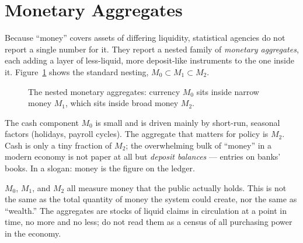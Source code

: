 \section{Monetary Aggregates}

Because ``money'' covers assets of differing liquidity, statistical agencies do not report a single number for it. They report a nested family of \emph{monetary aggregates}, each adding a layer of less-liquid, more deposit-like instruments to the one inside it. Figure~\ref{fig:macro-11} shows the standard nesting, $M_0 \subset M_1 \subset M_2$.

\begin{figure}[h]
\centering

\caption{The nested monetary aggregates: currency $M_0$ sits inside narrow money $M_1$, which sits inside broad money $M_2$.}
\label{fig:macro-11}
\end{figure}


The cash component $M_0$ is small and is driven mainly by short-run, seasonal factors (holidays, payroll cycles). The aggregate that matters for policy is $M_2$. Cash is only a tiny fraction of $M_2$; the overwhelming bulk of ``money'' in a modern economy is not paper at all but \emph{deposit balances} --- entries on banks' books. In a slogan: money is the figure on the ledger.

\begin{remark}
$M_0$, $M_1$, and $M_2$ all measure money that the public actually holds. This is not the same as the total quantity of money the system could create, nor the same as ``wealth.'' The aggregates are stocks of liquid claims in circulation at a point in time, no more and no less; do not read them as a census of all purchasing power in the economy.
\end{remark}

